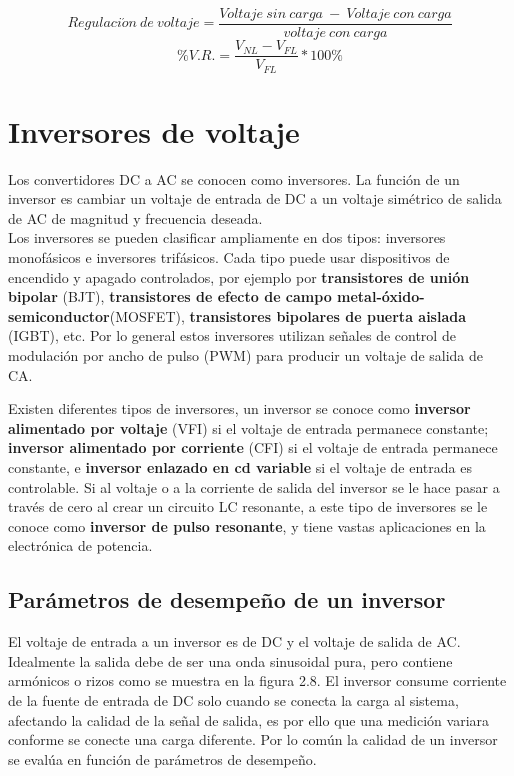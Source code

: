 $$Regulaci\acute{o}n\:de\: voltaje = \dfrac{Voltaje\: sin \:carga \:-\: Voltaje\: con\: carga}{voltaje\: con\: carga}$$
\begin{equation} 
 \%V.R. = \dfrac{V_{NL}-V_{FL}}{V_{FL}}*100\%
\end{equation}





\newpage

\section{Inversores de voltaje}

Los convertidores DC a AC se conocen como inversores. La función de un inversor es cambiar un voltaje de entrada de DC a un voltaje simétrico de salida de AC de magnitud y frecuencia deseada. \\

Los inversores se pueden clasificar ampliamente en dos tipos: inversores monofásicos e inversores trifásicos. Cada tipo puede usar dispositivos de encendido y apagado controlados, por ejemplo por \textbf{transistores de unión bipolar} (BJT), \textbf{transistores de efecto de campo metal-óxido-semiconductor}(MOSFET), \textbf{transistores bipolares de puerta aislada} (IGBT), etc. Por lo general estos inversores utilizan señales de control de modulación por ancho de pulso  (PWM) para producir un voltaje de salida de CA.

Existen diferentes tipos de inversores, un inversor se conoce como \textbf{inversor alimentado por voltaje} (VFI) si el voltaje de entrada permanece constante; \textbf{inversor alimentado por corriente} (CFI) si el voltaje de entrada permanece constante, e \textbf{inversor enlazado en cd variable} si el voltaje de entrada es controlable. Si al voltaje o a la corriente de salida del inversor se le hace pasar a través de cero al crear un circuito LC resonante, a este tipo de inversores se le conoce como \textbf{inversor de pulso resonante}, y tiene vastas aplicaciones en la electrónica de potencia. \\

\subsection{Parámetros de desempeño de un inversor}

El voltaje de entrada a un inversor es de DC y el voltaje de salida de AC. Idealmente la salida debe de ser una onda sinusoidal pura, pero contiene armónicos o rizos como se muestra en la figura 2.8. El inversor consume corriente de la fuente de entrada de DC solo cuando se conecta la carga al sistema, afectando la calidad de la señal de salida, es por ello que una medición variara conforme se conecte una carga diferente. Por lo común la calidad de un inversor se evalúa en función de parámetros de desempeño. \\

